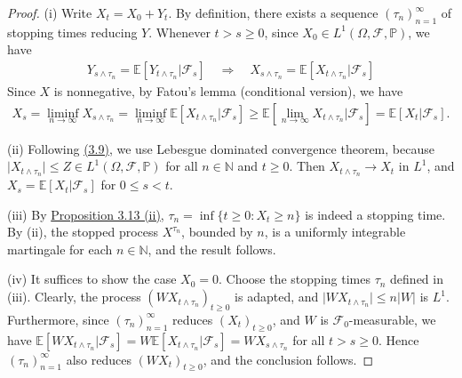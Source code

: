 \documentclass{article}
\numberwithin{equation}{section}
\newcommand{\E}{\mathbb{E}}
\renewcommand{\P}{\mathbb{P}}
\theoremstyle{plain}
\theoremstyle{definition}
\begin{document}
\begin{proof}
(i) Write $X_t=X_0+Y_t$. By definition, there exists a sequence $(\tau_n)_{n=1}^\infty$ of stopping times reducing $Y$. Whenever $t>s\geq 0$, since $X_0\in L^1(\Omega,\mathscr{F},\P)$, we have
\begin{align*}
	Y_{s\wedge\tau_n} = \E[Y_{t\wedge\tau_n}|\mathscr{F}_s] \quad\Rightarrow\quad X_{s\wedge\tau_n} = \E[X_{t\wedge\tau_n}|\mathscr{F}_s]\tag{3.9}\label{eq:3.9}
\end{align*}
Since $X$ is nonnegative, by Fatou's lemma (conditional version), we have
\begin{align*}
	X_s = \liminf_{n\to\infty} X_{s\wedge\tau_n} = \liminf_{n\to\infty} \E[X_{t\wedge\tau_n}|\mathscr{F}_s]\geq \E\left[\lim_{n\to\infty}X_{t\wedge\tau_n}|\mathscr{F}_s\right] = \E[X_t|\mathscr{F}_s].
\end{align*}

(ii) Following \hyperref[eq:3.9]{(3.9)}, we use Lebesgue dominated convergence theorem, because $\vert X_{t\wedge\tau_n}\vert\leq Z\in L^1(\Omega,\mathscr{F},\P)$ for all $n\in\mathbb{N}$ and $t\geq 0$. Then $X_{t\wedge\tau_n}\to X_t$ in $L^1$, and $X_s=\E[X_t|\mathscr{F}_s]$ for $0\leq s<t$.

(iii) By \hyperref[prop:3.13]{Proposition 3.13 (ii)}, $\tau_n=\inf\{t\geq 0:X_t\geq n\}$ is indeed a stopping time. By (ii), the stopped process $X^{\tau_n}$, bounded by $n$, is a uniformly integrable martingale for each $n\in\mathbb{N}$, and the result follows.

(iv) It suffices to show the case $X_0=0$. Choose the stopping times $\tau_n$ defined in (iii). Clearly, the process $(WX_{t\wedge\tau_n})_{t\geq 0}$ is adapted, and $\vert WX_{t\wedge\tau_n}\vert\leq n\vert W\vert$ is $L^1$. Furthermore, since $(\tau_n)_{n=1}^\infty$ reduces $(X_t)_{t\geq 0}$, and $W$ is $\mathscr{F}_0$-measurable, we have $\E[WX_{t\wedge\tau_n}|\mathscr{F}_s] = W\E[X_{t\wedge\tau_n}|\mathscr{F}_s] = WX_{s\wedge\tau_n}$ for all $t>s\geq 0$. Hence $(\tau_n)_{n=1}^\infty$ also reduces $(WX_t)_{t\geq 0}$, and the conclusion follows.
\end{proof}
\end{document}
